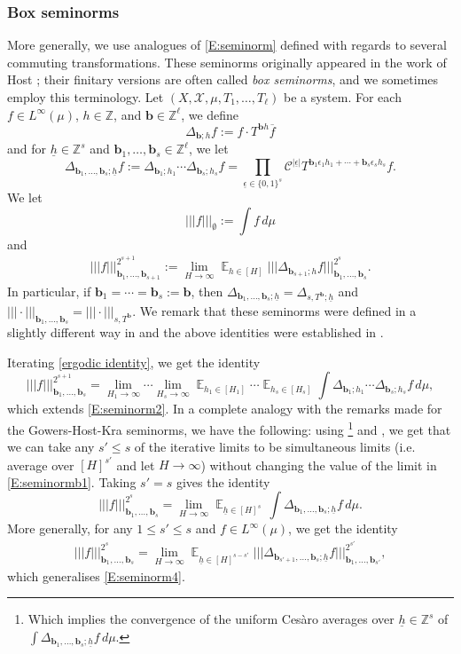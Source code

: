 \documentclass[11pt]{amsart}
\theoremstyle{definition}
\newcommand{\Z}{{\mathbb Z}}
\newcommand{\CC}{{\mathcal C}}
\newcommand{\CX}{{\mathcal X}}
\renewcommand{\b}{{\textbf{b}}}
\newcommand{\uh}{{\underline{h}}}
\newcommand{\eps}{\epsilon}
\newcommand{\ueps}{{\underline{\epsilon}}}
\newcommand{\nnorm}[1]{\lvert\!|\!| #1|\!|\!\rvert}
\DeclareMathOperator*{\E}{\mathbb{E}}
\begin{document}
\subsubsection{Box seminorms} More generally,  we use analogues of \eqref{E:seminorm} defined with regards to several commuting transformations. These seminorms originally appeared in the work of Host \cite{Ho09}; their finitary versions are often called \emph{box seminorms}, and we sometimes employ this terminology. Let $(X, \CX, \mu, T_1, \ldots, T_\ell)$ be a system.
 For each $f\in L^{\infty}(\mu)$, $h\in \Z$, and $\b \in \Z^\ell$, we define
 $$
 \Delta_{\b; h} f := f \cdot T^{\b h} \overline{f}
 $$
   and for $\uh\in\Z^s$ and $\b_1,\ldots, \b_s\in \Z^\ell$, we let
$$
\Delta_{{\b_1}, \ldots, {\b_{s}}; \uh} f  := \Delta_{{\b_1; h_1}}\cdots\Delta_{{\b_s; h_s}} f = \prod_{\ueps\in\{0,1\}^s} \CC^{|\ueps|} T^{\b_1 \eps_1 h_1 + \cdots + \b_s \eps_s h_s}f.
$$
 We let
$$
\nnorm{f}_{\emptyset}:=\int f\, d\mu
$$
and
\begin{align}\label{ergodic identity}
	\nnorm{f}_{{\b_1}, \ldots, {\b_{s+1}}}^{2^{s+1}}:=\lim_{H\to\infty}\E_{h\in[H]}\nnorm{\Delta_{{\b_{s+1}}; h}f}_{{\b_1}, \ldots, {\b_{s}}}^{2^s}.
\end{align}
In particular, if $\b_1 = \cdots = \b_s:=\b$, then $ \Delta_{\b_1, \ldots, \b_s; \uh}=\Delta_{s, T^\b; \uh}$ and $  \nnorm{\cdot}_{\b_1, \ldots, \b_s}=\nnorm{\cdot}_{s, T^\b}$.
 We remark that these seminorms were defined in a slightly different way in \cite{Ho09}
 and the above identities were established in  \cite[Section~2.3]{Ho09}.

 Iterating \eqref{ergodic identity}, we get the identity
 \begin{equation}\label{E:seminormb1}
 	\nnorm{f}_{{\b_1}, \ldots, {\b_{s}}}^{2^{s+1}}=\lim_{H_1\to\infty}\cdots \lim_{H_s\to\infty}\E_{h_1\in [H_1]}\cdots \E_{h_s\in [H_s]} \int\Delta_{{\b_1; h_1}}\cdots\Delta_{{\b_s; h_s}} f\, d\mu,
 \end{equation}
which extends \eqref{E:seminorm2}. In a complete analogy with the remarks made for the Gowers-Host-Kra seminorms, we have the following: using \cite[Lemma~1]{Ho09}\footnote{Which implies  the convergence of the uniform Ces\`aro averages over $\uh\in \Z^s$ of  $\int \Delta_{{\b_1}, \ldots, {\b_{s}}; \uh} f\, d\mu$.} and \cite[Lemma~1.12]{BL15}, we get
 that we can take any $s'\leq s$  of the  iterative limits to be simultaneous limits (i.e. average over $[H]^{s'}$ and let $H\to\infty$)
without changing the value of the limit in \eqref{E:seminormb1}.
Taking $s'=s$  gives  the identity
$$
\nnorm{f}_{{\b_1}, \ldots, {\b_{s}}}^{2^s}=\lim_{H\to\infty}\E_{\uh\in [H]^s}\,\int \Delta_{{\b_1}, \ldots, {\b_{s}}; \uh} f\, d\mu.
$$
More generally, for any $1\leq s'\leq s$ and $f\in L^\infty(\mu)$, we get the identity
\begin{align}\label{inductive formula}
	\nnorm{f}_{\b_1, \ldots, \b_s}^{2^s} = \lim_{H\to\infty}\E_{\uh\in[H]^{s-s'}}\nnorm{\Delta_{\b_{s'+1}, \ldots, \b_s; \uh}f}_{\b_1, \ldots, \b_{s'}}^{2^{s'}},
\end{align}
which generalises \eqref{E:seminorm4}.
\end{document}
